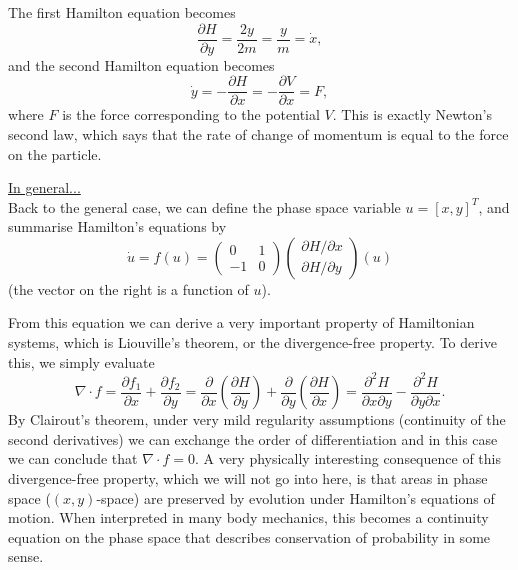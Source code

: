 \documentclass[11pt, letterpaper, oneside]{article}     %
\numberwithin{equation}{subsection}
\theoremstyle{definition}
\numberwithin{theorem}{section}
\theoremstyle{remark}
\begin{document}
\begin{enumerate}
  The first Hamilton equation becomes
  \begin{equation}
    \frac{\partial H}{\partial y} = \frac{2y}{2m} = \frac{y}{m} = \dot x,
  \end{equation}
  and the second Hamilton equation becomes
  \begin{equation}
    \dot y = -\frac{\partial H}{\partial x} = -\frac{\partial V}{\partial x} = F,
  \end{equation}
  where $F$ is the force corresponding to the potential $V$. This is exactly Newton's second law, which says that the rate of change of momentum is equal to the force on the particle.

  \underline{In general...}\\
  Back to the general case, we can define the phase space variable $u = [x, y]^T$, and summarise Hamilton's equations by
  \begin{equation}
    \dot u = f(u) =
    \begin{pmatrix}
      0 & 1\\
      -1 & 0
    \end{pmatrix}
    \begin{pmatrix}
      \partial H/\partial x\\
      \partial H/\partial y
    \end{pmatrix}(u)
  \end{equation}
  (the vector on the right is a function of $u$).

  From this equation we can derive a very important property of Hamiltonian systems, which is Liouville's theorem, or the divergence-free property. To derive this, we simply evaluate
  \begin{equation}
    \nabla\cdot f = \frac{\partial f_1}{\partial x} + \frac{\partial f_2}{\partial y}
    = \frac{\partial}{\partial x}\left(\frac{\partial H}{\partial y}\right) + \frac{\partial}{\partial y}\left(\frac{\partial H}{\partial x}\right)
    = \frac{\partial^2H}{\partial x \partial y} - \frac{\partial^2H}{\partial y\partial x}.
  \end{equation}
  By Clairout's theorem, under very mild regularity assumptions (continuity of the second derivatives) we can exchange the order of differentiation and in this case we can conclude that $\nabla\cdot f = 0$. A very physically interesting consequence of this divergence-free property, which we will not go into here, is that areas in phase space ($(x,y)$-space) are preserved by evolution under Hamilton's equations of motion. When interpreted in many body mechanics, this becomes a continuity equation on the phase space that describes conservation of probability in some sense.


\end{enumerate}
\end{document}

